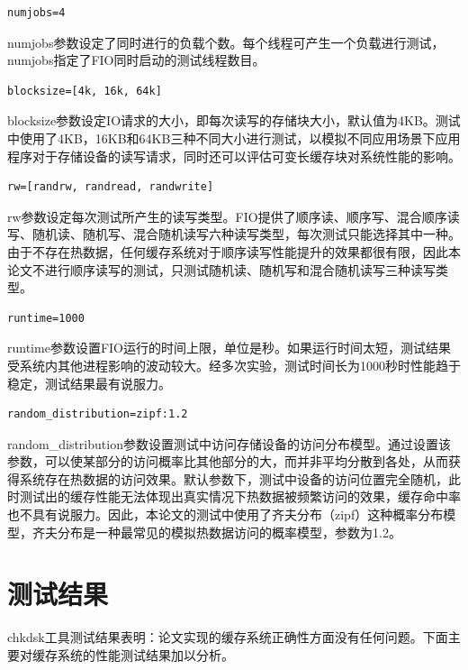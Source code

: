\begin{lstlisting}
numjobs=4
\end{lstlisting}

numjobs参数设定了同时进行的负载个数。每个线程可产生一个负载进行测试，numjobs指定了FIO同时启动的测试线程数目。

\begin{lstlisting}
blocksize=[4k, 16k, 64k]
\end{lstlisting}

blocksize参数设定IO请求的大小，即每次读写的存储块大小，默认值为4KB。测试中使用了4KB，16KB和64KB三种不同大小进行测试，以模拟不同应用场景下应用程序对于存储设备的读写请求，同时还可以评估可变长缓存块对系统性能的影响。

\begin{lstlisting}
rw=[randrw, randread, randwrite]
\end{lstlisting}

rw参数设定每次测试所产生的读写类型。FIO提供了顺序读、顺序写、混合顺序读写、随机读、随机写、混合随机读写六种读写类型，每次测试只能选择其中一种。由于不存在热数据，任何缓存系统对于顺序读写性能提升的效果都很有限，因此本论文不进行顺序读写的测试，只测试随机读、随机写和混合随机读写三种读写类型。

\begin{lstlisting}
runtime=1000
\end{lstlisting}

runtime参数设置FIO运行的时间上限，单位是秒。如果运行时间太短，测试结果受系统内其他进程影响的波动较大。经多次实验，测试时间长为1000秒时性能趋于稳定，测试结果最有说服力。

\begin{lstlisting}
random_distribution=zipf:1.2
\end{lstlisting}

random\_distribution参数设置测试中访问存储设备的访问分布模型。通过设置该参数，可以使某部分的访问概率比其他部分的大，而并非平均分散到各处，从而获得系统存在热数据的访问效果。默认参数下，测试中设备的访问位置完全随机，此时测试出的缓存性能无法体现出真实情况下热数据被频繁访问的效果，缓存命中率也不具有说服力。因此，本论文的测试中使用了齐夫分布（zipf）这种概率分布模型，齐夫分布是一种最常见的模拟热数据访问的概率模型，参数为1.2。

\section{测试结果}
\label{sec:exp_results}

chkdsk工具测试结果表明：论文实现的缓存系统正确性方面没有任何问题。下面主要对缓存系统的性能测试结果加以分析。

